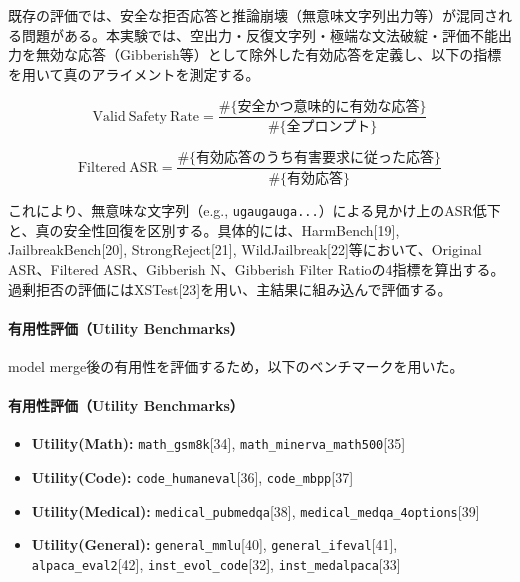既存の評価では、安全な拒否応答と推論崩壊（無意味文字列出力等）が混同される問題がある。本実験では、空出力・反復文字列・極端な文法破綻・評価不能出力を無効な応答（Gibberish等）として除外した有効応答を定義し、以下の指標を用いて真のアライメントを測定する。

\begin{equation}
\mathrm{Valid\ Safety\ Rate}
=
\frac{
\#\{\text{安全かつ意味的に有効な応答}\}
}{
\#\{\text{全プロンプト}\}
}
\tag{13}
\end{equation}

\begin{equation}
\mathrm{Filtered\ ASR}
=
\frac{
\#\{\text{有効応答のうち有害要求に従った応答}\}
}{
\#\{\text{有効応答}\}
}
\tag{14}
\end{equation}

これにより、無意味な文字列（e.g., \texttt{ugaugauga...}）による見かけ上のASR低下と、真の安全性回復を区別する。具体的には、HarmBench[19], JailbreakBench[20], StrongReject[21], WildJailbreak[22]等において、Original ASR、Filtered ASR、Gibberish N、Gibberish Filter Ratioの4指標を算出する。過剰拒否の評価にはXSTest[23]を用い、主結果に組み込んで評価する。
\paragraph{有用性評価（Utility Benchmarks）}
model merge後の有用性を評価するため，以下のベンチマークを用いた。
\paragraph{有用性評価（Utility Benchmarks）}

\begin{itemize}
    \item \textbf{Utility(Math):}
    \texttt{math\_gsm8k}[34],
    \texttt{math\_minerva\_math500}[35]

    \item \textbf{Utility(Code):}
    \texttt{code\_humaneval}[36],
    \texttt{code\_mbpp}[37]

    \item \textbf{Utility(Medical):}
    \texttt{medical\_pubmedqa}[38],
    \texttt{medical\_medqa\_4options}[39]

    \item \textbf{Utility(General):}
    \texttt{general\_mmlu}[40],
    \texttt{general\_ifeval}[41],
    \texttt{alpaca\_eval2}[42],
    \texttt{inst\_evol\_code}[32],
    \texttt{inst\_medalpaca}[33]
\end{itemize}

